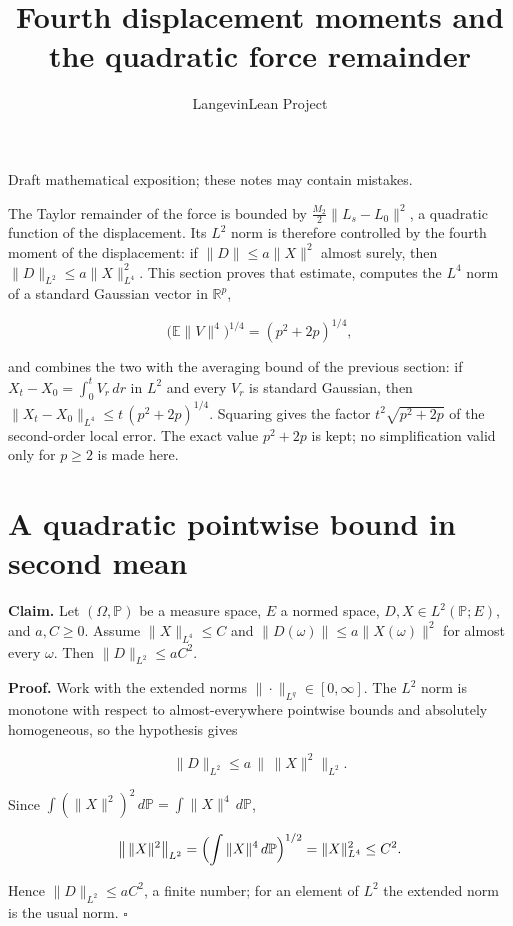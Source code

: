 \documentclass[11pt,a4paper]{article}
\title{\texorpdfstring{Fourth displacement moments and the quadratic force remainder}{Fourth displacement moments and the quadratic force remainder}}
\author{LangevinLean Project}
\date{}
\begin{document}
\maketitle
Draft mathematical exposition; these notes may contain mistakes.


The Taylor remainder of the force is bounded by \(\frac{M_2}{2}\|L_s-L_0\|^2\), a quadratic function of the displacement. Its \(L^2\) norm is therefore controlled by the fourth moment of the displacement: if \(\|D\|\le a\|X\|^2\) almost surely, then \(\|D\|_{L^2}\le a\|X\|_{L^4}^2\). This section proves that estimate, computes the \(L^4\) norm of a standard Gaussian vector in \(\mathbb R^p\),


\[\bigl(\mathbb E\|V\|^4\bigr)^{1/4}=(p^2+2p)^{1/4},\]


and combines the two with the averaging bound of the previous section: if \(X_t-X_0=\int_0^tV_r\,dr\) in \(L^2\) and every \(V_r\) is standard Gaussian, then \(\|X_t-X_0\|_{L^4}\le t\,(p^2+2p)^{1/4}\). Squaring gives the factor \(t^2\sqrt{p^2+2p}\) of the second-order local error. The exact value \(p^2+2p\) is kept; no simplification valid only for \(p\ge2\) is made here.


\section{\texorpdfstring{A quadratic pointwise bound in second mean}{A quadratic pointwise bound in second mean}}


\textbf{Claim.} Let \((\Omega,\mathbb P)\) be a measure space, \(E\) a normed space, \(D,X\in L^2(\mathbb P;E)\), and \(a,C\ge0\). Assume \(\|X\|_{L^4}\le C\) and \(\|D(\omega)\|\le a\|X(\omega)\|^2\) for almost every \(\omega\). Then \(\|D\|_{L^2}\le aC^2\).




\textbf{Proof.} Work with the extended norms \(\|\cdot\|_{L^q}\in[0,\infty]\). The \(L^2\) norm is monotone with respect to almost-everywhere pointwise bounds and absolutely homogeneous, so the hypothesis gives


\[\|D\|_{L^2}\le a\,\bigl\|\,\|X\|^2\bigr\|_{L^2}.\]


Since \(\int(\|X\|^2)^2\,d\mathbb P=\int\|X\|^4\,d\mathbb P\),


\[\bigl\|\,\|X\|^2\bigr\|_{L^2}=\Bigl(\int\|X\|^4\,d\mathbb P\Bigr)^{1/2}=\|X\|_{L^4}^2\le C^2.\]


Hence \(\|D\|_{L^2}\le aC^2\), a finite number; for an element of \(L^2\) the extended norm is the usual norm. \(\square\)
\end{document}
